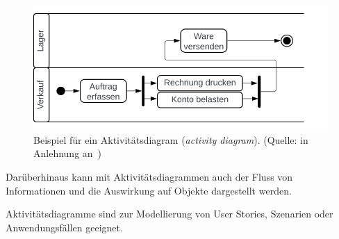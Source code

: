 \begin{figure}
    \centering
    \includegraphics[scale=0.5]{part two/Objektorientierte Analyse/img/activitydiagram}
    \caption{Beispiel für ein Aktivitätsdiagram (\textit{activity diagram}). (Quelle: in Anlehnung an~\cite[77, Abb. 2.9-14]{Bal05})}
    \label{fig:activitydiagram}
\end{figure}

\noindent
Darüberhinaus kann mit Aktivitätsdiagrammen  auch der Fluss von Informationen und die Auswirkung auf Objekte dargestellt werden.\\

\vspace{2mm}
\begin{tcolorbox}
Aktivitätsdiagramme sind zur Modellierung von User Stories, Szenarien oder Anwendungsfällen geeignet.
\end{tcolorbox}
\vspace{2mm}